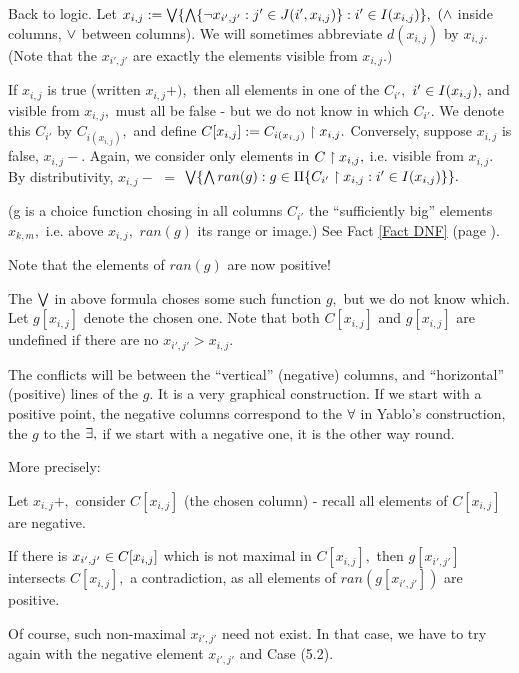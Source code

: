  \xDH
Back to logic. Let $x_{i,j}:= \bigvee \{ \bigwedge \{ \neg x_{i',j' }:j' \in
J(i',x_{i,j})\}:i' \in I(x_{i,j})\},$
$(\wedge $ inside columns, $ \vee $ between columns).
We will sometimes abbreviate $d(x_{i,j})$ by $x_{i,j}.$
(Note that the $x_{i',j' }$ are exactly the elements visible from
$x_{i,j}.)$

 \xEh
 \xDH
If $x_{i,j}$ is true (written $x_{i,j}+),$ then all elements in one of the
$C_{i' },$
$i' \in I(x_{i,j}),$
and visible from $x_{i,j},$ must all be false - but we do not know in
which $C_{i' }.$
We denote this $C_{i' }$ by $C_{i(x_{i,j})},$ and define
$C[x_{i,j}]:=C_{i(x_{i,j})} \upharpoonright x_{i,j}.$
 \xDH
Conversely, suppose $x_{i,j}$ is false, $x_{i,j}-.$
Again, we consider only elements in $C \upharpoonright x_{i,j},$ i.e. visible from
$x_{i,j}.$
By distributivity, $x_{i,j}-$ $=$ $ \bigvee \{ \bigwedge ran(g):g \in \Pi
\{C_{i' } \upharpoonright x_{i,j}:i' \in I(x_{i,j})\}\}.$

(g is a choice function chosing in all columns $C_{i' }$ the ``sufficiently
big''
elements $x_{k,m},$ i.e. above $x_{i,j},$
$ran(g)$ its range or image.)
See Fact \ref{Fact DNF} (page \pageref{Fact DNF}).

Note that the elements of $ran(g)$ are now positive!

The $ \bigvee $ in above formula choses some such function $g,$ but we do not
know which.
Let $g[x_{i,j}]$ denote the chosen one.
 \xDH
Note that both $C[x_{i,j}]$ and $g[x_{i,j}]$ are undefined if there are no
$x_{i',j' }>x_{i,j}.$
 \xEj

 \xDH


\label{Case DOA}

The conflicts will be between the ``vertical'' (negative) columns, and
``horizontal'' (positive) lines of the $g.$ It is a very graphical
construction. If we start with a positive point, the
negative columns correspond to the $ \forall $ in Yablo's
construction, the $g$ to the $ \exists,$ if we start with a negative one, it
is
the other way round.

More precisely:

 \xEh
 \xDH Let $x_{i,j}+,$ consider $C[x_{i,j}]$ (the chosen column) -
recall all elements of $C[x_{i,j}]$ are negative.

If there is $x_{i',j' } \in C[x_{i,j}]$ which is not maximal in
$C[x_{i,j}],$ then
$g[x_{i',j' }]$ intersects $C[x_{i,j}],$ a contradiction, as all elements
of $ran(g[x_{i',j' }])$
are positive.

Of course, such non-maximal $x_{i',j' }$ need not exist. In that case, we
have to
try again with the negative element $x_{i',j' }$ and Case (5.2).


